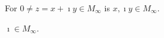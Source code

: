 \begin{lemma}
    \label{lem:construction_re_im}
    For $0 \ne z = x + \imath y \in M_{\infty}$ is $x, \imath y \in M_{\infty}$.
\end{lemma}

\begin{lemma}
    \label{lem:construction_imath}
    $\imath \in M_{\infty}$.
\end{lemma}
